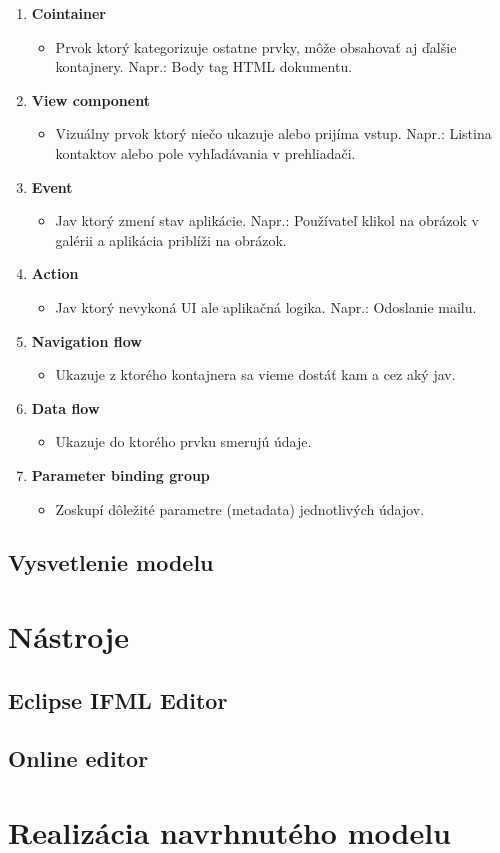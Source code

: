 \documentclass[12pt,slovak,a4paper]{article}
\begin{document}
\begin{enumerate}
	\item \textbf{Cointainer}
	\begin{itemize}
		\item Prvok ktorý kategorizuje ostatne prvky, môže obsahovať aj ďalšie kontajnery. Napr.: Body tag HTML dokumentu.
	\end{itemize}
	\item \textbf{View component}
	\begin{itemize}
		\item Vizuálny prvok ktorý niečo ukazuje alebo prijíma vstup. Napr.: Listina kontaktov alebo pole vyhľadávania v prehliadači.
	\end{itemize}
	\item \textbf{Event}
	\begin{itemize}
		\item Jav ktorý zmení stav aplikácie. Napr.: Používateľ klikol na obrázok v galérii a aplikácia priblíži na obrázok.
	\end{itemize}
	\item \textbf{Action}
	\begin{itemize}
		\item Jav ktorý nevykoná UI ale aplikačná logika. Napr.: Odoslanie mailu.
	\end{itemize}
	\item \textbf{Navigation flow}
	\begin{itemize}
		\item Ukazuje z ktorého kontajnera sa vieme dostáť kam a cez aký jav.
	\end{itemize}
	\item \textbf{Data flow}
	\begin{itemize}
		\item Ukazuje do ktorého prvku smerujú údaje.
	\end{itemize}
	\item \textbf{Parameter binding group}
	\begin{itemize}
		\item Zoskupí dôležité parametre (metadata) jednotlivých údajov.
	\end{itemize}
\end{enumerate}

\subsection{Vysvetlenie modelu}

\clearpage

\section{Nástroje}

\subsection{Eclipse IFML Editor}

\subsection{Online editor}

\section{Realizácia navrhnutého modelu}



\end{document}
